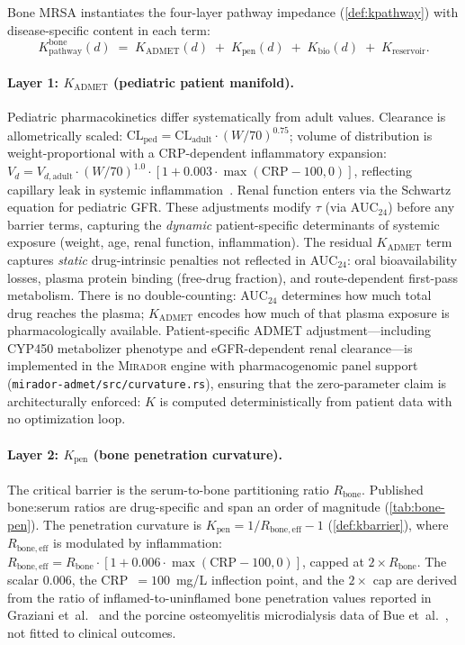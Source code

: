 \documentclass[11pt]{article}
\theoremstyle{plain}
\theoremstyle{definition}
\newcommand{\mirador}{\textsc{Mirador}}
\newcommand{\Kpath}{K_{\mathrm{pathway}}}
\newcommand{\Kres}{K_{\mathrm{reservoir}}}
\newcommand{\Kadmet}{K_{\mathrm{ADMET}}}
\begin{document}
Bone MRSA instantiates the four-layer pathway impedance
(\cref{def:kpathway}) with disease-specific content in each term:
\begin{equation}
  \label{eq:k-bone}
  \Kpath^{\mathrm{bone}}(d) \;=\;
  \Kadmet(d) \;+\; K_{\mathrm{pen}}(d) \;+\;
  K_{\mathrm{bio}}(d) \;+\; \Kres.
\end{equation}

\paragraph{Layer 1: $\Kadmet$ (pediatric patient manifold).}
Pediatric pharmacokinetics differ systematically from adult values.
Clearance is allometrically scaled:
$\mathrm{CL}_{\mathrm{ped}} = \mathrm{CL}_{\mathrm{adult}} \cdot
(W/70)^{0.75}$; volume of distribution is weight-proportional with
a CRP-dependent inflammatory expansion:
$V_d = V_{d,\mathrm{adult}} \cdot (W/70)^{1.0} \cdot
[1 + 0.003 \cdot \max(\mathrm{CRP} - 100, 0)]$, reflecting
capillary leak in systemic inflammation~\cite{Graziani1988}. Renal
function enters via the Schwartz equation for pediatric GFR. These
adjustments modify $\tau$ (via AUC$_{24}$) before any barrier
terms, capturing the \emph{dynamic} patient-specific determinants
of systemic exposure (weight, age, renal function, inflammation).
The residual $\Kadmet$ term captures \emph{static} drug-intrinsic
penalties not reflected in AUC$_{24}$: oral bioavailability losses,
plasma protein binding (free-drug fraction), and route-dependent
first-pass metabolism. There is no double-counting: AUC$_{24}$
determines how much total drug reaches the plasma; $\Kadmet$
encodes how much of that plasma exposure is pharmacologically
available. Patient-specific ADMET adjustment---including CYP450
metabolizer phenotype and eGFR-dependent renal clearance---is
implemented in the \mirador{} engine with pharmacogenomic panel
support (\texttt{mirador-admet/src/curvature.rs}), ensuring that
the zero-parameter claim is architecturally enforced: $K$ is
computed deterministically from patient data with no optimization
loop.

\paragraph{Layer 2: $K_{\mathrm{pen}}$ (bone penetration curvature).}
The critical barrier is the serum-to-bone partitioning ratio
$R_{\mathrm{bone}}$. Published bone:serum ratios are drug-specific
and span an order of magnitude (\cref{tab:bone-pen}). The
penetration curvature is $K_{\mathrm{pen}} = 1/R_{\mathrm{bone,eff}}
- 1$ (\cref{def:kbarrier}), where $R_{\mathrm{bone,eff}}$ is
modulated by inflammation:
$R_{\mathrm{bone,eff}} = R_{\mathrm{bone}} \cdot
[1 + 0.006 \cdot \max(\mathrm{CRP} - 100, 0)]$, capped at
$2 \times R_{\mathrm{bone}}$. The scalar $0.006$, the
CRP~$= 100$~mg/L inflection point, and the $2\times$ cap are
derived from the ratio of inflamed-to-uninflamed bone penetration
values reported in Graziani et~al.~\cite{Graziani1988} and the
porcine osteomyelitis microdialysis data of Bue
et~al.~\cite{Bue2018}, not fitted to clinical outcomes.
\end{document}
